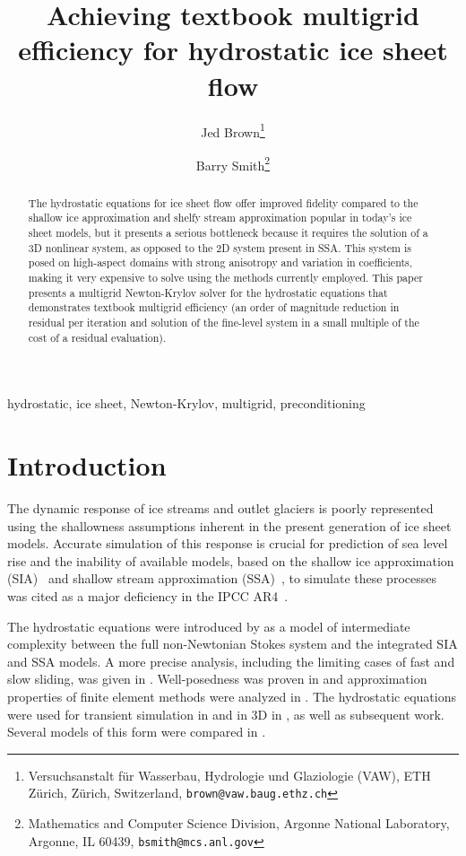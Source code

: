 \documentclass[10pt,letterpaper,oneeqnum,final]{siamltex}
\title{Achieving textbook multigrid efficiency for hydrostatic ice sheet flow}
\author{Jed Brown\thanks{Versuchsanstalt f\"ur Wasserbau, Hydrologie und Glaziologie (VAW), ETH Z\"urich, Z\"urich,
    Switzerland, \texttt{brown@vaw.baug.ethz.ch}}
  \and Barry Smith\thanks{Mathematics and Computer Science Division, Argonne National Laboratory, Argonne, IL 60439, \texttt{bsmith@mcs.anl.gov}}
}
\begin{document}
\maketitle
\begin{abstract}
  The hydrostatic equations for ice sheet flow offer improved fidelity compared to the shallow ice
  approximation and shelfy stream approximation popular in today's ice sheet models, but
  it presents a serious bottleneck because it requires the solution of a 3D nonlinear system, as
  opposed to the 2D system present in SSA.  This system is posed on high-aspect domains with strong
  anisotropy and variation in coefficients, making it very expensive to solve using the methods
  currently employed.  This paper presents a multigrid Newton-Krylov solver for the hydrostatic
  equations that demonstrates textbook multigrid efficiency (an order of magnitude reduction in
  residual per iteration and solution of the fine-level system in a small multiple of the cost of a
  residual evaluation).
\end{abstract}
\begin{keywords}
  hydrostatic, ice sheet, Newton-Krylov, multigrid, preconditioning
\end{keywords}
\thispagestyle{plain}
\pagestyle{myheadings}

\section{Introduction}
The dynamic response of ice streams and outlet glaciers is poorly represented using the shallowness
assumptions inherent in the present generation of ice sheet models.  Accurate simulation of this
response is crucial for prediction of sea level rise and the inability of available models, based on
the shallow ice approximation (SIA)~\cite{hutter1983tgm} and shallow stream approximation
(SSA)~\cite{morland1987unconfined,weis1999theory}, to simulate these processes was cited as a major
deficiency in the IPCC AR4~\cite{ipcc2007ar4-syr}.

The hydrostatic equations were introduced by \cite{blatter1995vas} as a model of intermediate
complexity between the full non-Newtonian Stokes system and the integrated SIA and SSA models.  A
more precise analysis, including the limiting cases of fast and slow sliding, was given in
\cite{schoof2010thin}.  Well-posedness was proven in \cite{colinge1999strongly} and approximation
properties of finite element methods were analyzed in
\cite{glowinski2003approximation,chow2004finite}.  The hydrostatic equations were used for transient
simulation in \cite{pattyn2002tgr} and in 3D in \cite{pattyn2003ntd}, as well as subsequent work.
Several models of this form were compared in \cite{pattyn2008beh}.
\end{document}

